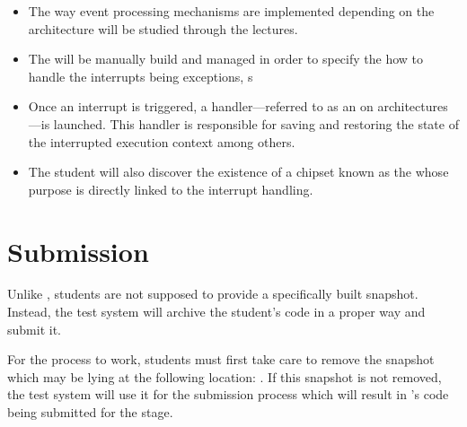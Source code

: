 \begin{itemize}
  \item

    \-

    The way event processing mechanisms are implemented depending on the
    architecture will be studied through the lectures.
  \item

    \-

    The  will be manually build and managed in order to specify
    the  how to handle the interrupts being exceptions,
    s \etc{}
  \item

    \-

    Once an interrupt is triggered, a handler---referred to as an 
    on  architectures---is launched. This handler is responsible
    for saving and restoring the state of the interrupted execution context
    among others.
  \item

    \-

    The student will also discover the existence of a chipset known as the
     whose purpose is directly linked to the interrupt handling.
\end{itemize}

\newpage

%
%

%
%

\section{Submission}

Unlike , students are not supposed to provide a specifically built
snapshot. Instead, the test system will archive the student's code in a proper
way and submit it.

For the process to work, students must first take care to remove the 
snapshot which may be lying at the following location:
. If this snapshot is not removed, the
test system will use it for the submission process which will result in
's code being submitted for the  stage.

